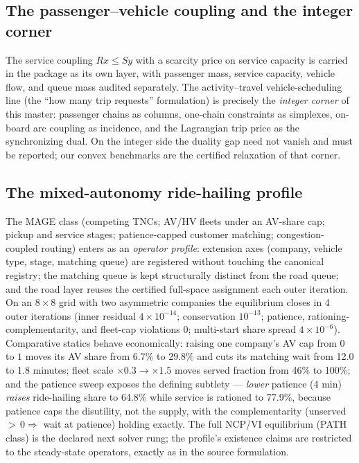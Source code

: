 \documentclass[11pt]{article}
\begin{document}
\subsection{The passenger--vehicle coupling and the integer corner}

The service coupling $Rx \le Sy$ with a scarcity price on service
capacity is carried in the package as its own layer, with passenger
mass, service capacity, vehicle flow, and queue mass audited
separately. The activity--travel vehicle-scheduling line (the
``how many trip requests'' formulation) is precisely the \emph{integer
corner} of this master: passenger chains as columns, one-chain
constraints as simplexes, on-board arc coupling as incidence, and the
Lagrangian trip price as the synchronizing dual. On the integer side
the duality gap need not vanish and must be reported; our convex
benchmarks are the certified relaxation of that corner.

\subsection{The mixed-autonomy ride-hailing profile}

The MAGE class (competing TNCs; AV/HV fleets under an AV-share cap;
pickup and service stages; patience-capped customer matching;
congestion-coupled routing) enters as an \emph{operator profile}:
extension axes (company, vehicle type, stage, matching queue) are
registered without touching the canonical registry; the matching queue
is kept structurally distinct from the road queue; and the road layer
reuses the certified full-space assignment each outer iteration.
On an $8\times8$ grid with two asymmetric companies the equilibrium
closes in 4 outer iterations (inner residual $4\times10^{-14}$;
conservation $10^{-13}$; patience, rationing-complementarity, and
fleet-cap violations $0$; multi-start share spread $4\times10^{-6}$).
Comparative statics behave economically: raising one company's AV cap
from $0$ to $1$ moves its AV share from 6.7\% to 29.8\% and cuts its
matching wait from 12.0 to 1.8 minutes; fleet scale $\times0.3 \to
\times1.5$ moves served fraction from 46\% to 100\%; and the patience
sweep exposes the defining subtlety --- \emph{lower} patience (4 min)
\emph{raises} ride-hailing share to 64.8\% while service is rationed to
77.9\%, because patience caps the disutility, not the supply, with the
complementarity (unserved ${>}\,0 \Rightarrow$ wait at patience)
holding exactly. The full NCP/VI equilibrium (PATH class) is the
declared next solver rung; the profile's existence claims are
restricted to the steady-state operators, exactly as in the source
formulation.
\end{document}
